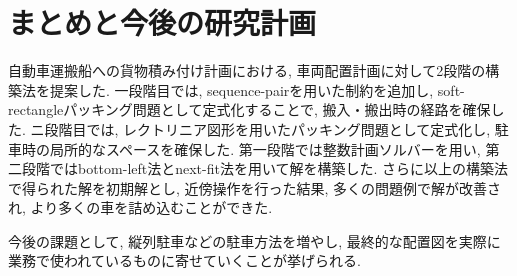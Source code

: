 \chapter{まとめと今後の研究計画}\label{conclution}
自動車運搬船への貨物積み付け計画における, 車両配置計画に対して2段階の構築法を提案した. 
一段階目では, sequence-pairを用いた制約を追加し, soft-rectangleパッキング問題として定式化することで, 搬入・搬出時の経路を確保した.  
ニ段階目では, レクトリニア図形を用いたパッキング問題として定式化し, 駐車時の局所的なスペースを確保した. 
第一段階では整数計画ソルバーを用い, 第二段階ではbottom-left法とnext-fit法を用いて解を構築した. 
さらに以上の構築法で得られた解を初期解とし, 近傍操作を行った結果, 多くの問題例で解が改善され, より多くの車を詰め込むことができた. 

今後の課題として, 縦列駐車などの駐車方法を増やし, 最終的な配置図を実際に業務で使われているものに寄せていくことが挙げられる. 
